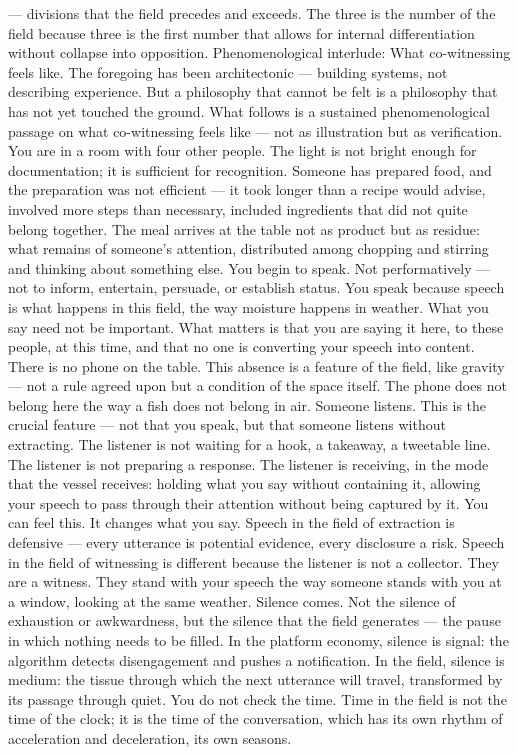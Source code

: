 — divisions that the field precedes and exceeds. The three is the number of the field because three is the first number that allows for internal differentiation without collapse into opposition. Phenomenological interlude: What co-witnessing feels like. The foregoing has been architectonic — building systems, not describing experience. But a philosophy that cannot be felt is a philosophy that has not yet touched the ground. What follows is a sustained phenomenological passage on what co-witnessing feels like — not as illustration but as verification. You are in a room with four other people. The light is not bright enough for documentation; it is sufficient for recognition. Someone has prepared food, and the preparation was not efficient — it took longer than a recipe would advise, involved more steps than necessary, included ingredients that did not quite belong together. The meal arrives at the table not as product but as residue: what remains of someone’s attention, distributed among chopping and stirring and thinking about something else. You begin to speak. Not performatively — not to inform, entertain, persuade, or establish status. You speak because speech is what happens in this field, the way moisture happens in weather. What you say need not be important. What matters is that you are saying it here, to these people, at this time, and that no one is converting your speech into content. There is no phone on the table. This absence is a feature of the field, like gravity — not a rule agreed upon but a condition of the space itself. The phone does not belong here the way a fish does not belong in air. Someone listens. This is the crucial feature — not that you speak, but that someone listens without extracting. The listener is not waiting for a hook, a takeaway, a tweetable line. The listener is not preparing a response. The listener is receiving, in the mode that the vessel receives: holding what you say without containing it, allowing your speech to pass through their attention without being captured by it. You can feel this. It changes what you say. Speech in the field of extraction is defensive — every utterance is potential evidence, every disclosure a risk. Speech in the field of witnessing is different because the listener is not a collector. They are a witness. They stand with your speech the way someone stands with you at a window, looking at the same weather. Silence comes. Not the silence of exhaustion or awkwardness, but the silence that the field generates — the pause in which nothing needs to be filled. In the platform economy, silence is signal: the algorithm detects disengagement and pushes a notification. In the field, silence is medium: the tissue through which the next utterance will travel, transformed by its passage through quiet. You do not check the time. Time in the field is not the time of the clock; it is the time of the conversation, which has its own rhythm of acceleration and deceleration, its own seasons.

